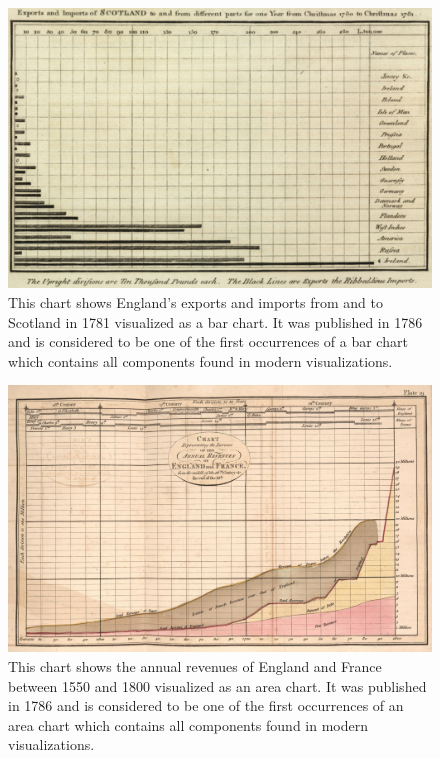 \begin{figure}[tp]
    \centering
    \includegraphics[keepaspectratio,width=\linewidth,height=\fullh / 3]
    {images/playfair-bar-chart.png}
    \caption[Bar Chart by William Playfair from 1786]{
        This chart shows England's exports and imports from and to Scotland in 1781 visualized as a bar chart. It was published in 1786 and is considered to be one of the first occurrences of a bar chart which contains all components found in modern visualizations. 
    }
    \label{fig:PlayfairBarChart}
\end{figure}

\begin{figure}[tp]
    \centering
    \includegraphics[keepaspectratio,width=\linewidth,height=\fullh / 3]
    {images/playfair-area-chart.png}
    \caption[Area Chart by William Playfair from 1786]{
        This chart shows the annual revenues of England and France between 1550 and 1800 visualized as an area chart. It was published in 1786 and is considered to be one of the first occurrences of an area chart which contains all components found in modern visualizations. 
    }
    \label{fig:PlayfairAreaChart}
\end{figure}

